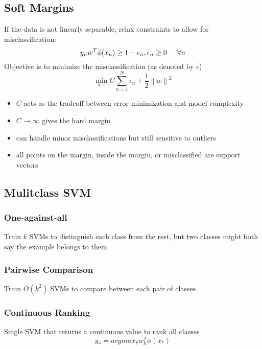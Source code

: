 \documentclass[]{article}
\theoremstyle{definition}
\newcommand\norm[1]{\left\lVert#1\right\rVert}
\begin{document}
    \subsection{Soft Margins}
    \label{sub:soft_margins}
    If the data is not linearly separable, relax constraints to allow for misclassification:
    \begin{equation*}
        y_n w^T \phi(x_n) \geq 1 - \epsilon_n, \epsilon_n \geq 0 \hspace{5mm}  \forall n
    \end{equation*} 
    Objective is to minimize the misclassification (as denoted by $\epsilon$)
    \begin{equation*}
        \min_{w, \epsilon} C \sum_{n=1}^N \epsilon_n + \frac{1}{2} \norm w^2
    \end{equation*}

    \begin{itemize}
        \item $C$ acts as the tradeoff between error minimization and model complexity
        \item $C \rightarrow \infty$ gives the hard margin
        \item can handle minor misclassifications but still sensitive to outliers
        \item all points on the margin, inside the margin, or misclassified are support vectors
    \end{itemize}

    \subsection{Mulitclass SVM}
    \label{sub:mulitclass_svm}

    \subsubsection{One-against-all}
    \label{ssub:One-against-all}
    Train $k$ SVMs to distinguish each class from the rest, but two classes might both say the example belongs to them

    \subsubsection{Pairwise Comparison}
    \label{ssub:Pairwise Comparison}
    Train $O(k^2)$ SVMs to compare between each pair of classes

    \subsubsection{Continuous Ranking}
    \label{ssub:Continuous Ranking}
    Single SVM that returns a continuous value to rank all classes
    \begin{equation*}
        y_* = argmax_k w_k^T \phi(x_*)
    \end{equation*}
\end{document}

